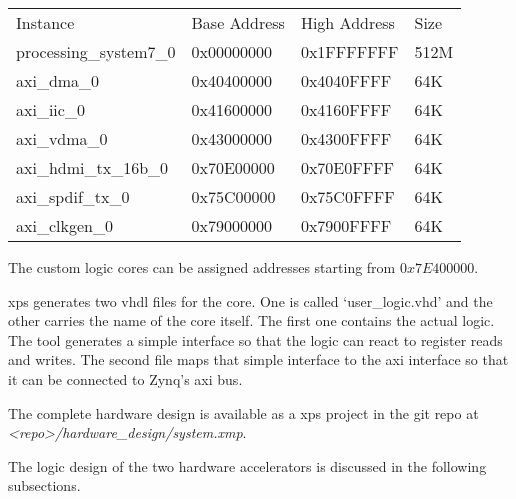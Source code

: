 \begin{tabular}{llll}
	Instance                & Base Address & High Address & Size\\
	processing\_system7\_0  & 0x00000000   & 0x1FFFFFFF   & 512M\\
	axi\_dma\_0             & 0x40400000   & 0x4040FFFF   & 64K\\
	axi\_iic\_0             & 0x41600000   & 0x4160FFFF   & 64K\\
	axi\_vdma\_0            & 0x43000000   & 0x4300FFFF   & 64K\\
	axi\_hdmi\_tx\_16b\_0   & 0x70E00000   & 0x70E0FFFF   & 64K\\
	axi\_spdif\_tx\_0       & 0x75C00000   & 0x75C0FFFF   & 64K\\
	axi\_clkgen\_0          & 0x79000000   & 0x7900FFFF   & 64K
\end{tabular}

The custom logic cores can be assigned addresses starting from $0x7E400000$.

\gls{xps} generates two \gls{vhdl} files for the core.
One is called `user\_logic.vhd' and the other carries the name of the core
itself.
The first one contains the actual logic.
The tool generates a simple interface so that the logic can react to register
reads and writes.
The second file maps that simple interface to the \gls{axi} interface so that
it can be connected to Zynq's \gls{axi} bus.

The complete hardware design is available as a \gls{xps} project in the git repo
at \emph{<repo>/hardware\_design/system.xmp}.

The logic design of the two hardware accelerators is discussed in the following
subsections.
